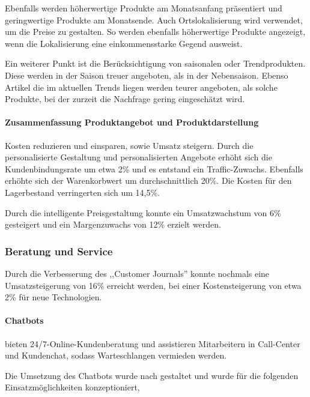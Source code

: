 Ebenfalls werden höherwertige Produkte am Monatsanfang präsentiert und geringwertige Produkte am Monatsende. Auch Ortslokalisierung wird verwendet, um die Preise zu gestalten. So werden ebenfalls höherwertige Produkte angezeigt, wenn die Lokalisierung eine einkommensstarke Gegend ausweist.\vspace{0.2cm}

Ein weiterer Punkt ist die Berücksichtigung von saisonalen oder Trendprodukten. Diese werden in der Saison treuer angeboten, als in der Nebensaison. Ebenso Artikel die im aktuellen Trends liegen werden teurer angeboten, als solche Produkte, bei der zurzeit die Nachfrage gering eingeschätzt wird.

\paragraph{Zusammenfassung Produktangebot und Produktdarstellung} Kosten reduzieren und einsparen, sowie Umsatz steigern. Durch die personalisierte Gestaltung und personalisierten Angebote erhöht sich die Kundenbindungsrate um etwa 2\% und es entstand ein Traffic-Zuwachs. Ebenfalls erhöhte sich der Warenkorbwert um durchschnittlich 20\%. Die Kosten für den Lagerbestand verringerten sich um 14,5\%.\vspace{0.2cm}

Durch die intelligente Preisgestaltung konnte ein Umsatzwachstum von 6\% gesteigert und ein Margenzuwachs von 12\% erzielt werden.

\subsubsection{Beratung und Service}

Durch die Verbesserung des ,,Customer Journals'' konnte nochmals eine Umsatzsteigerung von 16\% erreicht werden, bei einer Kostensteigerung von etwa 2\% für neue Technologien.

\paragraph{Chatbots} bieten 24/7-Online-Kun\-den\-be\-ra\-tung und assistieren Mitarbeitern in Call-Center und Kundenchat, sodass Warteschlangen vermieden werden.\vspace{0.2cm}

Die Umsetzung des Chatbots wurde nach \cite{chatlogue_chatbot_tasks} gestaltet und wurde für die folgenden Einsatzmöglichkeiten konzeptioniert,

